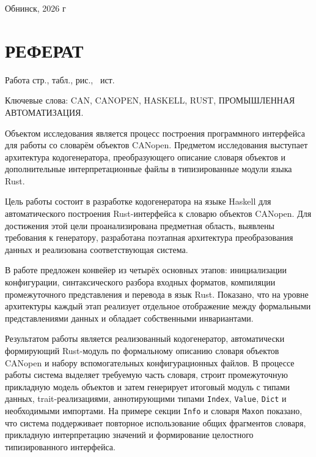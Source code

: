 \documentclass[a4paper,12pt]{article}
\begin{document}
\vfill
\large

\begin{center}
Обнинск, 2026 г
\end{center}

\onehalfspacing
\pagebreak



\section*{\centering РЕФЕРАТ}

Работа  стр.,  табл.,
 рис., \totalmycitecounts\ ист.

Ключевые слова: CAN, CANOPEN, HASKELL, RUST, ПРОМЫШЛЕННАЯ АВТОМАТИЗАЦИЯ.

Объектом исследования является процесс построения программного интерфейса для работы
со словарём объектов CANopen. Предметом исследования выступает архитектура
кодогенератора, преобразующего описание словаря объектов и дополнительные
интерпретационные файлы в типизированные модули языка Rust.

Цель работы состоит в разработке кодогенератора на языке Haskell для автоматического
построения Rust-интерфейса к словарю объектов CANopen. Для достижения этой цели
проанализирована предметная область, выявлены требования к генератору, разработана
поэтапная архитектура преобразования данных и реализована соответствующая система.

В работе предложен конвейер из четырёх основных этапов: инициализации конфигурации,
синтаксического разбора входных форматов, компиляции промежуточного представления и
перевода в язык Rust. Показано, что на уровне архитектуры каждый этап реализует
отдельное отображение между формальными представлениями данных и обладает собственными
инвариантами.

Результатом работы является реализованный кодогенератор, автоматически формирующий
Rust-модуль по формальному описанию словаря объектов CANopen и набору вспомогательных
конфигурационных файлов. В процессе работы система выделяет требуемую часть словаря,
строит промежуточную прикладную модель объектов и затем генерирует итоговый модуль с
типами данных, trait-реализациями, аннотирующими типами \texttt{Index},
\texttt{Value}, \texttt{Dict} и необходимыми импортами. На примере секции
\texttt{Info} и словаря \texttt{Maxon} показано, что система поддерживает повторное
использование общих фрагментов словаря, прикладную интерпретацию значений и
формирование целостного типизированного интерфейса.
\end{document}
